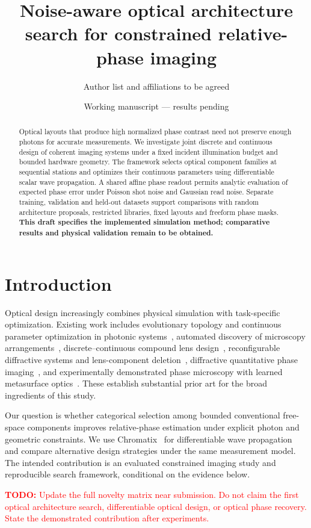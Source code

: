 \documentclass[11pt]{article}
\title{Noise-aware optical architecture search for constrained relative-phase imaging}
\author{Author list and affiliations to be agreed}
\date{Working manuscript --- results pending}
\newcommand{\todo}[1]{\par\noindent\textcolor{red}{\textbf{TODO:} #1}\par}
\begin{document}
\maketitle
\begin{abstract}
Optical layouts that produce high normalized phase contrast need not preserve
enough photons for accurate measurements. We investigate joint discrete and
continuous design of coherent imaging systems under a fixed incident illumination
budget and bounded hardware geometry. The framework selects optical component
families at sequential stations and optimizes their continuous parameters using
differentiable scalar wave propagation. A shared affine phase readout permits
analytic evaluation of expected phase error under Poisson shot noise and Gaussian
read noise. Separate training, validation and held-out datasets support comparisons
with random architecture proposals, restricted libraries, fixed layouts and
freeform phase masks. \textbf{This draft specifies the implemented simulation
method; comparative results and physical validation remain to be obtained.}
\end{abstract}

\section{Introduction}
Optical design increasingly combines physical simulation with task-specific
optimization. Existing work includes evolutionary topology and continuous
parameter optimization in photonic systems~\cite{aesop}, automated discovery of
microscopy arrangements~\cite{xlumina}, discrete--continuous compound lens
design~\cite{teh}, reconfigurable diffractive systems and lens-component
deletion~\cite{chord,zhang}, diffractive quantitative phase imaging~\cite{mengu}, and
experimentally demonstrated phase microscopy with learned metasurface
optics~\cite{neuralphase}. These establish substantial prior art for the broad
ingredients of this study.

Our question is whether categorical selection among bounded conventional
free-space components improves relative-phase estimation under explicit photon
and geometric constraints. We use Chromatix~\cite{chromatix} for differentiable
wave propagation and compare alternative design strategies under the same
measurement model. The intended contribution is an evaluated constrained imaging
study and reproducible search framework, conditional on the evidence below.
\todo{Update the full novelty matrix near submission. Do not claim the first
optical architecture search, differentiable optical design, or optical phase
recovery. State the demonstrated contribution after experiments.}
\end{document}
